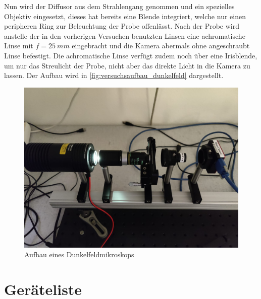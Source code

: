\documentclass[ngerman]{scrartcl}
\begin{document}
Nun wird der Diffusor aus dem Strahlengang genommen und ein spezielles Objektiv eingesetzt, dieses hat bereits eine Blende integriert, welche nur einen peripheren Ring zur Beleuchtung der Probe offenlässt. Nach der Probe wird anstelle der in den vorherigen Versuchen benutzten Linsen eine achromatische Linse mit $f = \SI{25}{mm}$ eingebracht und die Kamera abermals ohne angeschraubt Linse befestigt. Die achromatische Linse verfügt zudem noch über eine Irisblende, um nur das Streulicht der Probe, nicht aber das direkte Licht in die Kamera zu lassen. Der Aufbau wird in \autoref{fig:versuchsaufbau_dunkelfeld} dargestellt.
%
\begin{figure}[H]
    \centering
    \begin{samepage}
        \includegraphics[width=\linewidth]{fig/Dunkelfeld.jpeg}
        \caption{Aufbau eines Dunkelfeldmikroskops}
        \label{fig:versuchsaufbau_dunkelfeld}
    \end{samepage}
\end{figure}



\section{Geräteliste}
\label{sec:geraeteliste}
\end{document}
